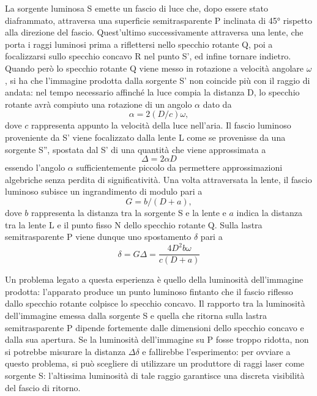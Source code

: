 La sorgente luminosa S emette un fascio di luce che, dopo essere stato diaframmato, attraversa una superficie semitrasparente P inclinata di 45° rispetto alla direzione del fascio. Quest'ultimo successivamente attraversa una lente, che porta i raggi luminosi prima a riflettersi nello specchio rotante Q, poi a focalizzarsi sullo specchio concavo R nel punto S', ed infine tornare indietro.
Quando però lo specchio rotante Q viene messo in rotazione a velocità angolare $\omega$, si ha che l'immagine prodotta dalla sorgente S' non coincide più con il raggio di andata: nel tempo necessario affinché la luce compia la distanza D, lo specchio rotante avrà compiuto una rotazione di un angolo $\alpha$ dato da 
\begin{equation}
    \alpha=2(D/c)\omega,
\end{equation}
dove $c$ rappresenta appunto la velocità della luce nell'aria. Il fascio luminoso proveniente da S' viene focalizzato dalla lente L come se provenisse da una sorgente S'', spostata dal S' di una quantità che viene approssimata a 
\begin{equation}
    \Delta=2\alpha D
\end{equation}
essendo l'angolo $\alpha$ sufficientemente piccolo da permettere approssimazioni algebriche senza perdita di significatività.
Una volta attraversata la lente, il fascio luminoso subisce un ingrandimento di modulo pari a 
\begin{equation}
    G=b/(D+a),
\end{equation}
dove $b$ rappresenta la distanza tra la sorgente S e la lente e $a$ indica la distanza tra la lente L e il punto fisso N dello specchio rotante Q.
Sulla lastra semitrasparente P viene dunque uno spostamento $\delta$ pari a 
\begin{equation}
    \delta=G\Delta=\frac{4D^2b\omega}{c(D+a)}
    \label{delta}
\end{equation}

Un problema legato a questa esperienza è quello della luminosità dell'immagine prodotta: l'apparato produce un punto luminoso fintanto che il fascio riflesso dallo specchio rotante colpisce lo specchio concavo. Il rapporto tra la luminosità dell'immagine emessa dalla sorgente S e quella che ritorna sulla lastra semitrasparente P dipende fortemente dalle dimensioni dello specchio concavo e dalla sua apertura. Se la luminosità dell'immagine su P fosse troppo ridotta, non si potrebbe misurare la distanza $\Delta \delta$ e fallirebbe l'esperimento: per ovviare a questo problema, si può scegliere di utilizzare un produttore di raggi laser come sorgente S: l'altissima luminosità di tale raggio garantisce una discreta visibilità del fascio di ritorno. 